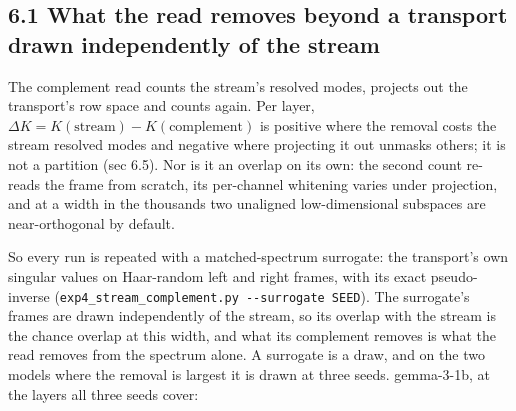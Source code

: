 \documentclass[10pt,letterpaper,twocolumn]{article}
\begin{document}
\subsection{6.1 What the read removes beyond a transport drawn independently of the stream}\label{61-what-the-read-removes-beyond-a-transport-drawn-independently-of-the-stream}

The complement read counts the stream's resolved modes, projects out the transport's row space and
counts again. Per layer, \(\Delta K = K(\text{stream}) - K(\text{complement})\) is positive where the
removal costs the stream resolved modes and negative where projecting it out unmasks others; it is
not a partition (sec 6.5). Nor is it an overlap on its own: the second count re-reads the frame
from scratch, its per-channel whitening varies under projection, and at a width in the thousands
two unaligned low-dimensional subspaces are near-orthogonal by default.

So every run is repeated with a matched-spectrum surrogate: the transport's own singular values on
Haar-random left and right frames, with its exact pseudo-inverse
(\texttt{exp4\_\allowbreak{}stream\_\allowbreak{}complement.\allowbreak{}py\ -{}\allowbreak{}-{}\allowbreak{}surrogate\ SEED}). The surrogate's frames are drawn independently of
the stream, so its overlap with the stream is the chance overlap at this width, and what its
complement removes is what the read removes from the spectrum alone.
A surrogate is a draw, and on the two models where the removal is largest it is drawn at three
seeds. gemma-3-1b, at the layers all three seeds cover:
\end{document}
